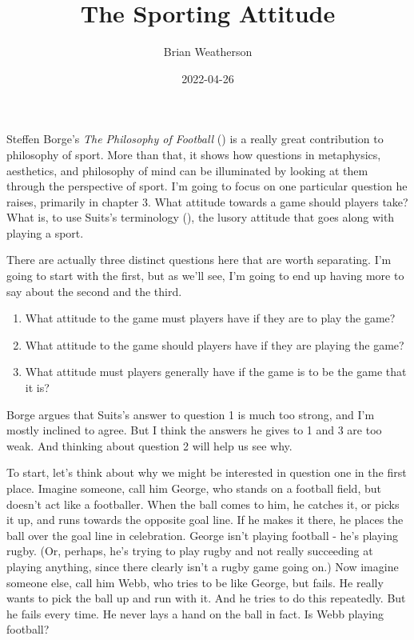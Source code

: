 \documentclass[
  11pt,
  letterpaper,
  DIV=11,
  numbers=noendperiod,
  oneside]{scrartcl}
\title{The Sporting Attitude}
\author{Brian Weatherson}
\date{2022-04-26}
\providecommand{\tightlist}{%
  \setlength{\itemsep}{0pt}\setlength{\parskip}{0pt}}\usepackage{longtable,booktabs,array}
\begin{document}
\maketitle
Steffen Borge's \emph{The Philosophy of Football}
() is a really great contribution to
philosophy of sport. More than that, it shows how questions in
metaphysics, aesthetics, and philosophy of mind can be illuminated by
looking at them through the perspective of sport. I'm going to focus on
one particular question he raises, primarily in chapter 3. What attitude
towards a game should players take? What is, to use Suits's terminology
(), the lusory attitude that goes
along with playing a sport.


There are actually three distinct questions here that are worth
separating. I'm going to start with the first, but as we'll see, I'm
going to end up having more to say about the second and the third.

\begin{enumerate}
\def\labelenumi{\arabic{enumi}.}
\tightlist
\item
  What attitude to the game must players have if they are to play the
  game?
\item
  What attitude to the game should players have if they are playing the
  game?
\item
  What attitude must players generally have if the game is to be the
  game that it is?
\end{enumerate}

Borge argues that Suits's answer to question 1 is much too strong, and
I'm mostly inclined to agree. But I think the answers he gives to 1 and
3 are too weak. And thinking about question 2 will help us see why.

To start, let's think about why we might be interested in question one
in the first place. Imagine someone, call him George, who stands on a
football field, but doesn't act like a footballer. When the ball comes
to him, he catches it, or picks it up, and runs towards the opposite
goal line. If he makes it there, he places the ball over the goal line
in celebration. George isn't playing football - he's playing rugby. (Or,
perhaps, he's trying to play rugby and not really succeeding at playing
anything, since there clearly isn't a rugby game going on.) Now imagine
someone else, call him Webb, who tries to be like George, but fails. He
really wants to pick the ball up and run with it. And he tries to do
this repeatedly. But he fails every time. He never lays a hand on the
ball in fact. Is Webb playing football?
\end{document}

